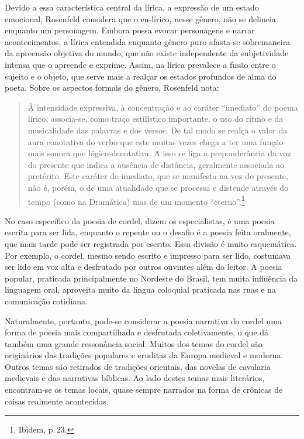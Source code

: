 \documentclass[11pt]{extarticle}
\begin{document}
Devido a essa característica central da lírica, a expressão de um estado emocional, Rosenfeld considera que o eu-lírico, nesse gênero, não se delineia enquanto um personagem. Embora possa evocar personagens e narrar acontecimentos, a lírica entendida enquanto gênero puro afasta-se sobremaneira da apreensão objetiva do mundo, que não existe independente da subjetividade intensa que o apreende e exprime. Assim, na lírica prevalece a fusão entre o sujeito e o objeto, que serve mais a realçar os estados profundos de alma do poeta.
Sobre os aspectos formais do gênero, Rosenfeld nota:

\begin{quote}
À intensidade expressiva, à concentração e ao caráter ``imediato'' do poema lírico, associa-se, como traço estilístico importante, o uso do ritmo e da musicalidade das palavras e dos versos. De tal modo se realça o valor da aura conotativa do verbo que este muitas vezes chega a ter uma função mais sonora que lógico-denotativa. A isso se liga a preponderância da voz do presente que indica a ausência de distância, geralmente associada ao pretérito. Este caráter do imediato, que se manifesta na voz do presente, não é, porém, o de uma atualidade que se processa e distende através do tempo (como na Dramática) mas de um momento ``eterno''.\footnote{Ibidem, p.\,23.}
\end{quote}

No caso específico da poesia de cordel, dizem os especialistas, é uma poesia escrita para
ser lida, enquanto o repente ou o desafio é a poesia feita oralmente, que mais tarde pode
ser registrada por escrito. Essa divisão é muito esquemática. Por exemplo, o
cordel, mesmo sendo escrito e impresso para ser lido, costumava ser lido em
voz alta e desfrutado por outros ouvintes além do leitor. A poesia popular,
praticada principalmente no Nordeste do Brasil, tem muita influência da
linguagem oral, aproveita muito da língua coloquial praticada nas ruas e na
comunicação cotidiana. 

Naturalmente, portanto, pode-se considerar a poesia narrativa do cordel uma
forma de poesia mais compartilhada e desfrutada coletivamente, o que dá também
uma grande ressonância social. Muitos dos temas do cordel são originários das
tradições populares e eruditas da Europa medieval e moderna. Outros temas são
retirados de tradições orientais, das novelas de cavalaria medievais e das narrativas
bíblicas. Ao lado destes temas mais literários, encontram-se os temas locais,
quase sempre narrados na forma de crônicas de coisas realmente acontecidas.
\end{document}
